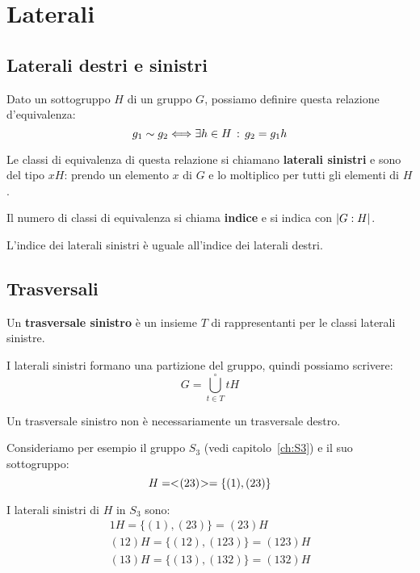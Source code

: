 \chapter{Laterali}
\label{ch:laterali}

\section{Laterali destri e sinistri}
\label{sec:laterali}

Dato un sottogruppo $H$ di un gruppo $G$, possiamo definire questa relazione d'equivalenza:
\begin{equation*}
	g_1 \sim g_2 \Longleftrightarrow \exists h \in H \,:\, g_2 = g_1 h
\end{equation*}

Le classi di equivalenza di questa relazione si chiamano \textbf{laterali sinistri} e sono del tipo $xH$: prendo un elemento $x$ di $G$ e lo moltiplico per tutti gli elementi di $H$.

Il numero di classi di equivalenza si chiama \textbf{indice} e si indica con $\lvert G:H \rvert$.

L'indice dei laterali sinistri è uguale all'indice dei laterali destri.

\section{Trasversali}
\label{sec:trasversali}

Un \textbf{trasversale sinistro} è un insieme $T$ di rappresentanti per le classi laterali sinistre.

I laterali sinistri formano una partizione del gruppo, quindi possiamo scrivere:
\begin{equation*}
	G = \bigcup^\circ_{t \in T} tH
\end{equation*}

Un trasversale sinistro non è necessariamente un trasversale destro.

Consideriamo per esempio il gruppo $S_3$ (vedi capitolo~\ref{ch:S3}) e il suo sottogruppo:
\begin{equation*}
	H=< \negmedspace (23) \negmedspace > = \{(1), (23)\}
\end{equation*}

I laterali sinistri di $H$ in $S_3$ sono:
\begin{gather*}
	1H = \{(1), (23)\} = (23)H \\
	(12)H = \{(12), (123)\} = (123)H \\
	(13)H = \{(13), (132)\} = (132)H
\end{gather*}

